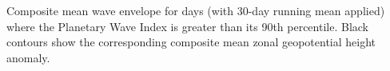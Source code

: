 \label{fig:envelope_climatology}
Composite mean wave envelope for days (with 30-day running mean applied) where the Planetary Wave Index is greater than its 90th percentile. Black contours show the corresponding composite mean zonal geopotential height anomaly.  